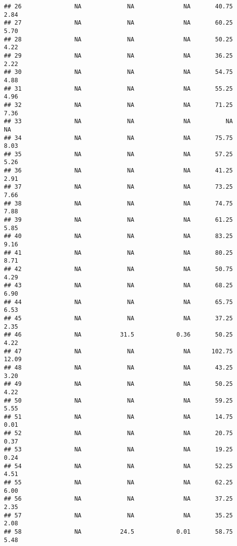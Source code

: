 \documentclass[]{article}
\begin{document}
\begin{verbatim}
## 26               NA             NA              NA       40.75         2.84
## 27               NA             NA              NA       60.25         5.70
## 28               NA             NA              NA       50.25         4.22
## 29               NA             NA              NA       36.25         2.22
## 30               NA             NA              NA       54.75         4.88
## 31               NA             NA              NA       55.25         4.96
## 32               NA             NA              NA       71.25         7.36
## 33               NA             NA              NA          NA           NA
## 34               NA             NA              NA       75.75         8.03
## 35               NA             NA              NA       57.25         5.26
## 36               NA             NA              NA       41.25         2.91
## 37               NA             NA              NA       73.25         7.66
## 38               NA             NA              NA       74.75         7.88
## 39               NA             NA              NA       61.25         5.85
## 40               NA             NA              NA       83.25         9.16
## 41               NA             NA              NA       80.25         8.71
## 42               NA             NA              NA       50.75         4.29
## 43               NA             NA              NA       68.25         6.90
## 44               NA             NA              NA       65.75         6.53
## 45               NA             NA              NA       37.25         2.35
## 46               NA           31.5            0.36       50.25         4.22
## 47               NA             NA              NA      102.75        12.09
## 48               NA             NA              NA       43.25         3.20
## 49               NA             NA              NA       50.25         4.22
## 50               NA             NA              NA       59.25         5.55
## 51               NA             NA              NA       14.75         0.01
## 52               NA             NA              NA       20.75         0.37
## 53               NA             NA              NA       19.25         0.24
## 54               NA             NA              NA       52.25         4.51
## 55               NA             NA              NA       62.25         6.00
## 56               NA             NA              NA       37.25         2.35
## 57               NA             NA              NA       35.25         2.08
## 58               NA           24.5            0.01       58.75         5.48

\end{verbatim}
\end{document}
